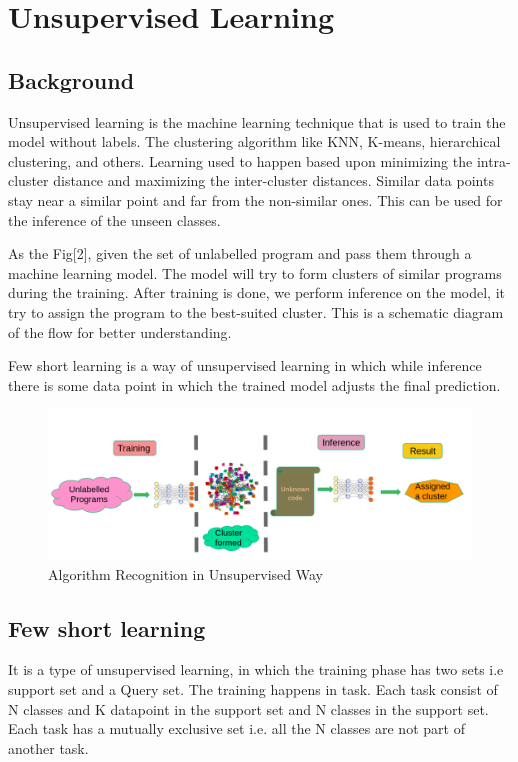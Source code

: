 \section{Unsupervised Learning}


\subsection{Background}
Unsupervised learning is the machine learning technique that is used to train the model without labels. The clustering algorithm like KNN, K-means, hierarchical clustering, and others. 
	Learning used to happen based upon minimizing the intra-cluster distance and maximizing the inter-cluster distances. Similar data points stay near a similar point and far from the non-similar ones. This can be used for the inference of the unseen classes.
	
	As the Fig[2], given the set of unlabelled program and pass them through a  machine learning model. The model will try to form clusters of similar programs during the training. After training is done, we perform inference on the model, it try to assign the program to the best-suited cluster. This is a schematic diagram of the flow for better understanding.

	Few short learning is a way of unsupervised learning in which while inference there is some data point in which the trained model adjusts the final prediction.

\begin{figure}[t]
    \centering
    \includegraphics[scale=0.4]{figures/chapter-2/unsupervised.png}
    \caption{Algorithm Recognition in Unsupervised Way}
     \label{fig:unsupervised-background}
\end{figure}

\subsection{Few short learning}
	    It is a type of unsupervised learning, in which the training phase has two sets i.e support set and a Query set. The training happens in task. Each task consist of N classes and K datapoint in the support set and N classes in the support set. Each task has a mutually exclusive set i.e. all the N classes are not part of another task.

